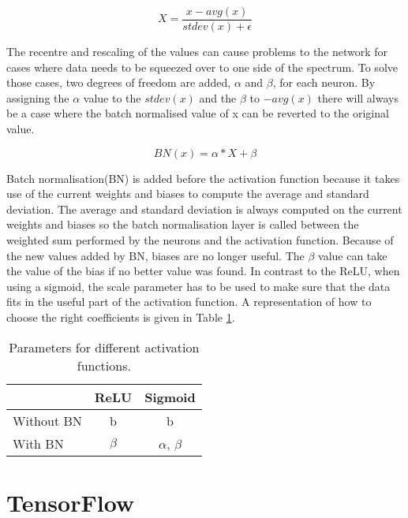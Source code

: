 \begin{equation}
	X= \dfrac{x - avg(x)}{stdev(x) + \epsilon} 
\end{equation}

The recentre and rescaling of the values can cause problems to
the network for cases where data needs to be squeezed over 
to one side of the spectrum.
To solve those cases, two degrees of freedom are added, 
$\alpha$ and $\beta$, for each neuron. 
By assigning the $\alpha$ value to the $stdev(x)$ and the
$\beta$ to $-avg(x)$ there will always be a case where the batch
normalised value of x can be reverted to the original value.

\begin{equation}
	BN(x) = \alpha * X + \beta
\end{equation}

Batch normalisation(BN) is added before the activation function
because it takes use of the current weights and biases to
compute the average and standard deviation. 
The average and standard deviation is always computed on the
current weights and biases so the batch normalisation layer is
called between the weighted sum performed by the neurons and the
activation function. Because of the new values added by BN,
biases are no longer useful.
The $\beta$ value can take the value of the bias if no better
value was found.
In contrast to the ReLU, when using a sigmoid,
the scale parameter has to be used to make sure that
the data fits in the useful part of the activation function.
A representation of how to choose the right coefficients is
given in Table \ref{tab:Parameters}.

\begin{table}[htbp]
\centering
	\caption{Parameters for different activation functions.}
	\begin{tabular}{l c c}
	\toprule
  		& ReLU & Sigmoid \\\midrule
		Without BN &b & b  \\
		With BN & $\beta$ & $\alpha$, $\beta$  \\
	\bottomrule
	\end{tabular}
\label{tab:Parameters}
\end{table}

\section{TensorFlow}

